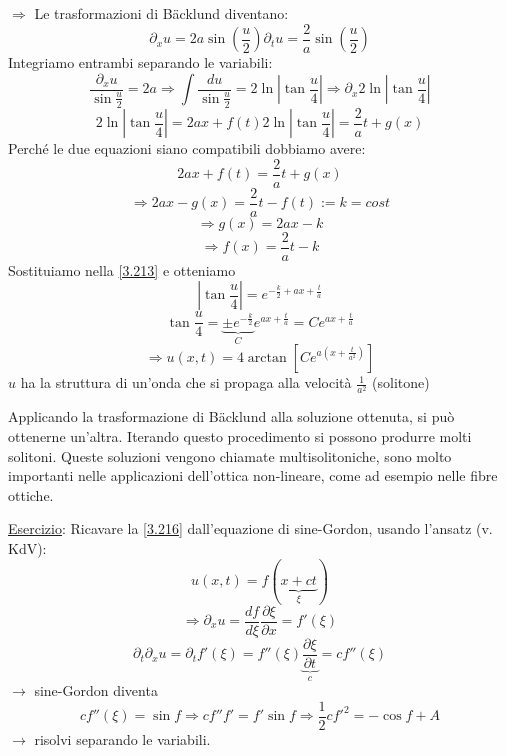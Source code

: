 \documentclass[a4paper,11pt]{report}
\begin{document}
$\Rightarrow$ Le trasformazioni di B\"acklund diventano:
\begin{subequations}
\begin{equation}
\partial_x u = 2a\sin\left(\frac{u}{2}\right) 
\label{3.212a}
\end{equation}
\begin{equation}
\partial_t u = \frac{2}{a}\sin\left(\frac{u}{2}\right) 
\label{3.212b}
\end{equation}
\end{subequations}
Integriamo entrambi separando le variabili:
\[
\frac{\partial_x u }{\sin\frac{u}{2}}=2a \Rightarrow \int\frac{du}{\sin\frac{u}{2}}=2\ln\left|\tan\frac{u}{4}\right| \Rightarrow \partial_x 2\ln \left| \tan \frac{u}{4}\right|
\]
\begin{subequations}
\begin{equation}
2 \ln \left| \tan \frac{u}{4}\right|=2ax + f(t) 
\label{3.213a}
\end{equation}
\begin{equation}
2 \ln \left| \tan \frac{u}{4}\right|= \frac{2}{a} t + g(x) 
\label{3.213b}
\end{equation}
\end{subequations}
Perch\'e le due equazioni siano compatibili dobbiamo avere:
\begin{equation}
2ax + f(t)=\frac{2}{a}t + g(x) 
\label{3.214}
\end{equation}
\[
\Rightarrow 2ax-g(x)=\frac{2}{a}t - f(t):=k = cost
\]
\[
\Rightarrow g(x)=2ax-k
\]
\[
\Rightarrow f(x)=\frac{2}{a}t-k
\]
Sostituiamo nella \eqref{3.213} e otteniamo
\[
\left| \tan \frac{u}{4}\right| = e^{-\frac{k}{2}+ax+\frac{t}{a}}
\]
\[
\tan \frac{u}{4} = \underbrace{\pm e^{-\frac{k}{2}}}_{C} e^{ax + \frac{t}{a}}=Ce^{ax + \frac{t}{a}}
\]
\begin{equation}
\Rightarrow u(x,t)=4\arctan \left[Ce^{a\left(x + \frac{t}{a^2}\right)}\right] 
\label{3.216}
\end{equation}
$u$ ha la struttura di un'onda che si propaga alla velocit\`a $\frac{1}{a^2}$ (solitone)

Applicando la trasformazione di B\"acklund alla soluzione ottenuta, si pu\`o ottenerne un'altra.
Iterando questo procedimento si possono produrre molti solitoni.
Queste soluzioni vengono chiamate multisolitoniche, sono molto importanti nelle applicazioni dell'ottica non-lineare, come ad esempio nelle fibre ottiche.

\medskip

\underline{Esercizio}: Ricavare la \eqref{3.216} dall'equazione di sine-Gordon, usando l'ansatz (v. KdV):
\[
u(x,t)=f(\underbrace{x+ct}_{\xi})
\]
\[
\Rightarrow \partial_x u = \frac{df}{d\xi}\frac{\partial \xi}{\partial x}=f'(\xi)
\]
\[
\partial_t\partial_xu=\partial_tf'(\xi)=f''(\xi) \underbrace{ \frac{\partial \xi}{\partial t} }_{c} = cf''(\xi)
\]
$\rightarrow$ sine-Gordon diventa
\[
c f''(\xi)=\sin f \Rightarrow cf''f'=f' \sin f \Rightarrow \frac{1}{2} c f'^2 = -\cos f + A
\]
$\rightarrow$ risolvi separando le variabili.
\end{document}
